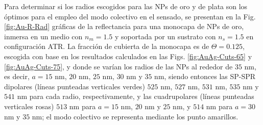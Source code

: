 Para determinar si los radios escogidos para las NPs de oro y de plata son los óptimos para el empleo del modo colectivo en el sensado, se presentan en la Fig. \ref{fig:Au-R-Rad}	gráficas de la reflectancia para una monocapa de NPs de oro, inmersa en un medio con $n_m=1.5$ y soportada por un sustrato con $n_s=1.5$ en configuración ATR. La fracción de cubierta de la monocapa es de $\Theta=0.125$, escogida con base en los resultados calculados en las Figs. \ref{fig:AuAg-Cuts-65} y \ref{fig:AuAg-Cuts-75}, y donde se varían los radios de las NPs al rededor de $35$ nm, es decir, $a=15$ nm, $20$ nm, $25$ nm, $30$ nm y $35$ nm, siendo entonces las SP-SPR dipolares (líneas punteadas verticales verdes) $525$ nm, $527$ nm, $531$ nm, $535$ nm y $541$ nm para cada radio, respectivamente, y las cuadrupolares (líneas punteadas verticales rosas) $513$ nm para $a=15$ nm, $20$ nm y $25$ nm, y $514$ nm para $a=30$ nm y $35$ nm; el modo colectivo se representa mediante los punto amarillos.

